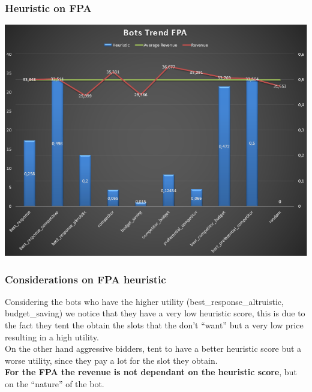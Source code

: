\documentclass{beamer}
\begin{document}
\begin{frame}
\frametitle{Heuristic on FPA}
\begin{center}
\includegraphics[scale=0.46]{img/Auctions/FPA_all_Heuristic.PNG} 
\end{center}
\end{frame}

\begin{frame}
\frametitle{Considerations on FPA heuristic}
Considering the bots who have the higher utility (best\_response\_altruistic, budget\_saving) we notice that they have a very \alert{low} heuristic score, this is due to the fact they tent the obtain the slots that the don't ``want'' but a very \alert{low price} resulting in a high utility.\\
\medskip
On the other hand aggressive bidders, tent to have a better heuristic score but a worse utility, since they pay a lot for the slot they obtain.\\
\medskip
\textbf{For the FPA the revenue is not dependant on the heuristic score}, but on the ``nature'' of the bot.
\end{frame}
\end{document}
